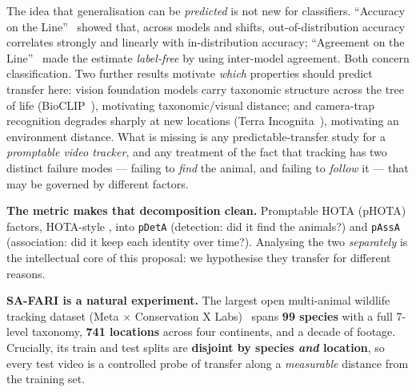 \documentclass[11pt]{article}
\begin{document}
The idea that generalisation can be \emph{predicted} is not new for classifiers. ``Accuracy on the
Line''~\cite{aotl} showed that, across models and shifts, out-of-distribution accuracy correlates
strongly and linearly with in-distribution accuracy; ``Agreement on the Line''~\cite{agl} made the
estimate \emph{label-free} by using inter-model agreement. Both concern classification. Two further
results motivate \emph{which} properties should predict transfer here: vision foundation models carry
taxonomic structure across the tree of life (BioCLIP~\cite{bioclip}), motivating taxonomic/visual
distance; and camera-trap recognition degrades sharply at new locations (Terra
Incognita~\cite{terra}), motivating an environment distance. What is missing is any predictable-transfer
study for a \emph{promptable video tracker}, and any treatment of the fact that tracking has two
distinct failure modes --- failing to \emph{find} the animal, and failing to \emph{follow} it --- that
may be governed by different factors.

\textbf{The metric makes that decomposition clean.} Promptable HOTA (pHOTA) factors, HOTA-style
\cite{hota}, into \texttt{pDetA} (detection: did it find the animals?) and \texttt{pAssA} (association:
did it keep each identity over time?). Analysing the two \emph{separately} is the intellectual core of
this proposal: we hypothesise they transfer for different reasons.

\textbf{SA-FARI is a natural experiment.} The largest open multi-animal wildlife tracking dataset
(Meta $\times$ Conservation X Labs)~\cite{safari} spans \textbf{99 species} with a full 7-level
taxonomy, \textbf{741 locations} across four continents, and a decade of footage. Crucially, its
train and test splits are \textbf{disjoint by species \emph{and} location}, so every test video is a
controlled probe of transfer along a \emph{measurable} distance from the training set.

\end{document}
